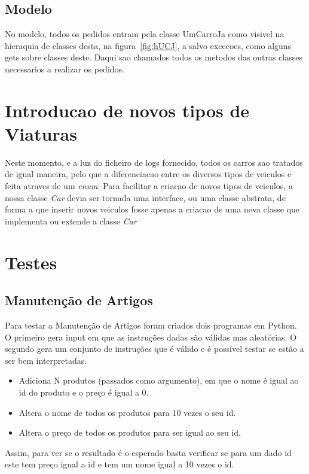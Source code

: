 \documentclass[a4paper]{report}
\begin{document}
\section{Modelo}

No modelo, todos os pedidos entram pela classe UmCarroJa como visivel na hieraquia de classes desta, na figura~\ref{fig:hUCJ}, a salvo excecoes, como alguns 
gets sobre classes deste. Daqui sao chamados todos os metodos das outras
classes necessarios a realizar os pedidos.

\chapter{Introducao de novos tipos de Viaturas}

Neste momento, e a luz do ficheiro de logs fornecido, todos os carros sao
tratados de igual maneira, pelo que a diferenciacao entre os diversos tipos
de veiculos e feita atraves de um \textit{enum}. Para facilitar a criacao
de novos tipos de veiculos, a nossa classe \textit{Car} 
devia ser tornada uma interface, ou uma classe abstrata, de forma a que inserir novos veiculos fosse apenas a criacao de uma nova classe que implementa ou extende a classe
\textit{Car}

\chapter{Testes}

\section{Manutenção de Artigos}

Para testar a Manutenção de Artigos foram criados dois programas em Python.
O primeiro gera input em que as instruções dadas são válidas mas aleatórias.
O segundo gera um conjunto de instruções que é válido e é possível testar se estão
a ser bem interpretadas.
\begin{itemize} 
    \item Adiciona N produtos (passados como argumento), em que o nome é igual ao id do
        produto e o preço é igual a 0.
    \item Altera o nome de todos os produtos para 10 vezes o seu id.
    \item Altera o preço de todos os produtos para ser igual ao seu id.
\end{itemize}
Assim, para ver se o resultado é o esperado basta verificar se para um dado id
este tem preço igual a id e tem um nome igual a 10 vezes o id.
\end{document}

